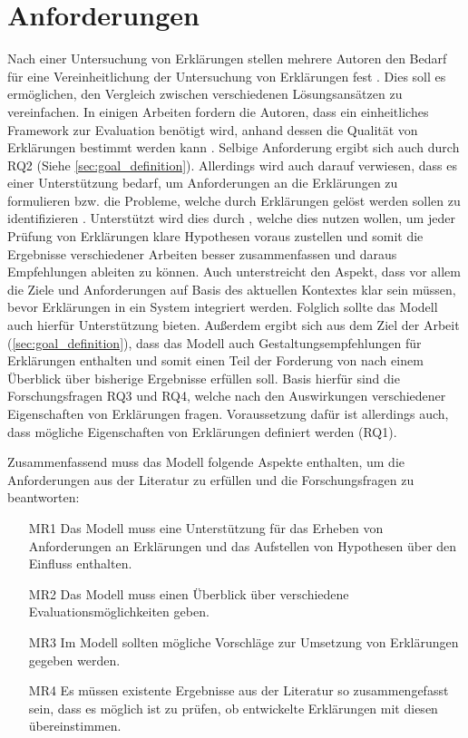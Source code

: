 \section{Anforderungen}

Nach einer Untersuchung von Erklärungen stellen mehrere Autoren den Bedarf für eine Vereinheitlichung der Untersuchung von Erklärungen fest \cite{cirqueira_scenario-based_2020,zahedi_towards_2019, nunes_systematic_2017, martin_evaluating_2021}. Dies soll es ermöglichen, den Vergleich zwischen verschiedenen Lösungsansätzen zu vereinfachen. In einigen Arbeiten fordern die Autoren, dass ein einheitliches Framework zur Evaluation benötigt wird, anhand dessen die Qualität von Erklärungen bestimmt werden kann \cite{nunes_systematic_2017,sokol_explainability_2020,chari_explanation_2020}. Selbige Anforderung ergibt sich auch durch RQ2 (Siehe \autoref{sec:goal_definition}). Allerdings wird auch darauf verwiesen, dass es einer Unterstützung bedarf, um Anforderungen an die Erklärungen zu formulieren bzw. die Probleme, welche durch Erklärungen gelöst werden sollen zu identifizieren \cite{chazette_end-users_nodate, doshi2017towards}. Unterstützt wird dies durch \citeauthor{waa_evaluating_2021}, welche dies nutzen wollen, um jeder Prüfung von Erklärungen klare Hypothesen voraus zustellen und somit die Ergebnisse verschiedener Arbeiten besser zusammenfassen und daraus Empfehlungen ableiten zu können. Auch \citeauthor{kohl_explainability_2019} unterstreicht den Aspekt, dass vor allem die Ziele und Anforderungen auf Basis des aktuellen Kontextes klar sein müssen, bevor Erklärungen in ein System integriert werden. Folglich sollte das Modell auch hierfür Unterstützung bieten. Außerdem ergibt sich aus dem Ziel der Arbeit (\autoref{sec:goal_definition}), dass das Modell auch Gestaltungsempfehlungen für Erklärungen enthalten und somit einen Teil der Forderung von \citeauthor{waa_evaluating_2021} nach einem Überblick über bisherige Ergebnisse erfüllen soll. Basis hierfür sind die Forschungsfragen RQ3 und RQ4, welche nach den Auswirkungen verschiedener Eigenschaften von Erklärungen fragen. Voraussetzung dafür ist allerdings auch, dass mögliche Eigenschaften von Erklärungen definiert werden (RQ1).

\smallskip

Zusammenfassend muss das Modell folgende Aspekte enthalten, um die Anforderungen aus der Literatur zu erfüllen und die Forschungsfragen zu beantworten:

\begin{enumerate}
    \item[MR1] Das Modell muss eine Unterstützung für das Erheben von Anforderungen an Erklärungen und das Aufstellen von Hypothesen über den Einfluss enthalten.
    \item[MR2] Das Modell muss einen Überblick über verschiedene Evaluationsmöglichkeiten geben.
    \item[MR3] Im Modell sollten mögliche Vorschläge zur Umsetzung von Erklärungen gegeben werden.
    \item[MR4] Es müssen existente Ergebnisse aus der Literatur so zusammengefasst sein, dass es möglich ist zu prüfen, ob entwickelte Erklärungen mit diesen übereinstimmen.
\end{enumerate}

